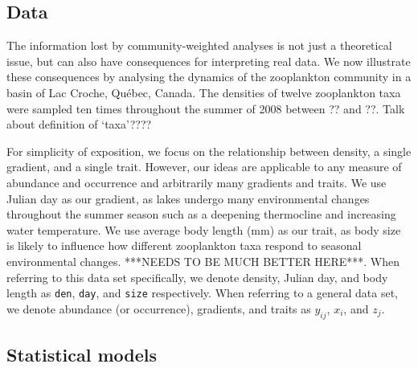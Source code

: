 \documentclass[12pt]{ecology}
\begin{document}
\subsection{Data}

The information lost by community-weighted analyses is not just a theoretical issue, but can also have consequences for interpreting real data.  We now illustrate these consequences by analysing the dynamics of the zooplankton community in a basin of Lac Croche, Qu\'{e}bec, Canada.  The densities of twelve zooplankton taxa were sampled ten times throughout the summer of 2008 between ?? and ??.    Talk about definition of `taxa'????

For simplicity of exposition, we focus on the relationship between density, a single gradient, and a single trait.  However, our ideas are applicable to any measure of abundance and occurrence and arbitrarily many gradients and traits.  We use Julian day as our gradient, as lakes undergo many environmental changes throughout the summer season such as a deepening thermocline and increasing water temperature.  We use average body length (mm) as our trait, as body size is likely to influence how different zooplankton taxa respond to seasonal environmental changes.  ***NEEDS TO BE MUCH BETTER HERE***.  When referring to this data set specifically, we denote density, Julian day, and body length as \texttt{den}, \texttt{day}, and \texttt{size} respectively.  When referring to a general data set, we denote abundance (or occurrence), gradients, and traits as $y_{ij}$, $x_i$, and $z_j$.


\subsection{Statistical models}
\end{document}
